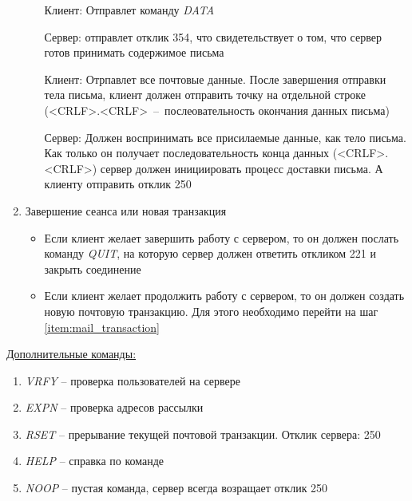 \documentclass[a4paper,12pt]{report}
\begin{document}
\begin{enumerate}
\begin{enumerate}
	         Клиент: Отправлет команду \textit{DATA} 
	         
	         Сервер: отправлет отклик 354, что свидетельствует о том, что сервер готов принимать содержимое письма
	         
	         Клиент: Отрпавлет все почтовые данные. После завершения отправки тела письма, клиент должен отправить точку на отдельной строке (<CRLF>.<CRLF>~--~послеовательность окончания данных письма)
	         
	         Сервер: Должен воспринимать все присилаемые данные, как тело письма. Как только он получает последовательность конца данных (<CRLF>.<CRLF>) сервер должен инициировать процесс доставки письма. А клиенту отправить отклик 250
	     \end{enumerate}
	     
	     \item Завершение сеанса или новая транзакция
	     \begin{itemize}
	         \item Если клиент желает завершить работу с сервером, то он должен послать команду \textit{QUIT}, на которую сервер должен ответить откликом 221 и закрыть соединение
	         \item Если клиент желает продолжить работу с сервером, то он должен создать новую почтовую транзакцию. Для этого необходимо перейти на шаг \ref{item:mail_transaction}
	     \end{itemize}
	 \end{enumerate}
	 
	 \underline{Дополнительные команды:}
	 \begin{enumerate}
	     \item \textit{VRFY} -- проверка пользователей на сервере
	     \item \textit{EXPN} -- проверка адресов рассылки
	     \item \textit{RSET} -- прерывание текущей почтовой транзакции. Отклик сервера: 250
	     \item \textit{HELP} -- справка по команде
	     \item \textit{NOOP} -- пустая команда, сервер всегда возращает отклик 250
	 \end{enumerate}
	
\end{document}
